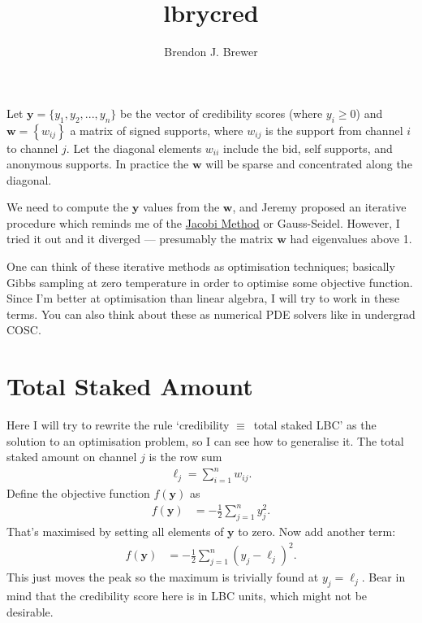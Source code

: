 \documentclass[a4paper, 12pt]{article}
\title{lbrycred}
\author{Brendon J. Brewer}
\date{}
\begin{document}
\maketitle


\setlength{\parindent}{0pt}
\setlength{\parskip}{8pt}

Let $\boldsymbol{y} = \{y_1, y_2, ..., y_n\}$ be the vector of credibility
scores (where $y_i \geq 0$) and $\boldsymbol{w} = \left\{w_{ij}\right\}$
a matrix of signed supports, where
$w_{ij}$ is the support from channel $i$ to channel $j$. Let the diagonal
elements $w_{ii}$ include the bid, self supports, and anonymous supports.
In practice the $\boldsymbol{w}$ will be sparse and concentrated along the
diagonal.

We need to compute the $\boldsymbol{y}$ values from the $\boldsymbol{w}$,
and Jeremy proposed an iterative procedure which reminds me of the
\href{https://en.wikipedia.org/wiki/Jacobi_method}{Jacobi Method} or
Gauss-Seidel. However,
I tried it out and it diverged --- presumably the matrix $\boldsymbol{w}$ had
eigenvalues above 1.

One can think of these iterative methods as optimisation techniques; basically
Gibbs sampling at zero temperature in order to optimise some objective
function. Since I'm better at optimisation than linear algebra, I will try to work in these terms. You can also think about these as numerical PDE solvers
like in undergrad COSC.

\section{Total Staked Amount}
Here I will try to rewrite the rule `credibility $\equiv$~total staked LBC'
as the solution to an optimisation problem, so I can see how to generalise it.
The total staked amount on channel $j$ is the row sum
\begin{align}
\ell_j = \sum_{i=1}^n w_{ij}.
\end{align}
Define the objective function $f(\boldsymbol{y})$ as
\begin{align}
f(\boldsymbol{y}) &= -\frac{1}{2}\sum_{j=1}^n y_j^2.
\end{align}
That's maximised by setting all elements of $\boldsymbol{y}$ to zero.
Now add another term:
\begin{align}
f(\boldsymbol{y}) &= -\frac{1}{2}\sum_{j=1}^n
                            \left(y_j - \ell_j\right)^2.
\end{align}
This just moves the peak so the maximum is trivially found at
$y_j = \ell_j$. Bear in mind that the credibility score here is in LBC
units, which might not be desirable.
\end{document}
